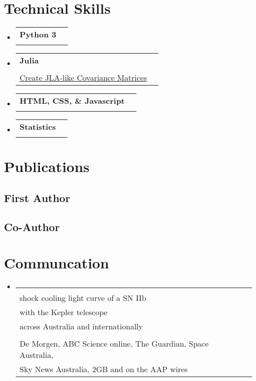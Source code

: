 \documentclass[letterpaper,11pt]{article}
\makeatletter
\newcommand{\resumeItem}[1]{
  \item\small{
    {#1 \vspace{-2pt}}
  }
}
\newcommand{\resumeSubheading}[4]{
  \vspace{-2pt}\item
    \begin{tabular*}{0.97\textwidth}[t]{l@{\extracolsep{\fill}}r}
      \textbf{#1} & #2 \\
      \textit{\small#3} & \textit{\small #4} \\
    \end{tabular*}\vspace{-7pt}
}
\newcommand{\resumeSubHeadingListStart}{\begin{itemize}[leftmargin=0.15in, label={}]}
\newcommand{\resumeSubHeadingListEnd}{\end{itemize}}
\newcommand{\resumeItemListStart}{\begin{itemize}}
\newcommand{\resumeItemListEnd}{\end{itemize}\vspace{-5pt}}
\newcommand{\communicationElement}[5]{%
    \resumeSubHeadingListStart
        \resumeSubheading
            {\makecell[l]{#1}}
            {\makecell[r]{#2}}
            {\makecell[l]{#3}}
            {\makecell[r]{#4}}
            \ifthenelse{\isempty{#5}}{}{%
                \resumeItemListStart
                    \renewcommand*{\do}[1]{\resumeItem{##1}}
                    \docsvlist{#5}%
                \resumeItemListEnd
            }%
    \resumeSubHeadingListEnd
}
\newcommand{\proficiencyElement}[5]{%
    \resumeSubHeadingListStart
        \resumeSubheading
            {#1}
            {#2}
            {\makecell[l]{#3}}
            {#4}
            {#5}
    \resumeSubHeadingListEnd
}
\makeatother
\begin{document}
\section{Technical Skills}

    \proficiencyElement{Python 3}{}{Example Projects: \href{https://github.com/dessn/Pippin}{\underline{Pippin Pipeline}}, \href{https://github.com/dessn/BiasValidation}{\underline{Approximate Neyman Construction Cosmology Validator}}}{}{}
    \proficiencyElement{Julia}{}{Example Projects: \href{https://github.com/OmegaLambda1998/ShockCooling.jl}{\underline{Fit Type II Shock Cooling Lightcurves}}, \href{https://github.com/OmegaLambda1998/SALTJacobian.jl}{\underline{Approximate SALT2/3 Simulations}},\\\phantom{\hbox{Example Projects: }}\href{https://github.com/OmegaLambda1998/JLACovarianceMatrix.jl}{\underline{Create JLA-like Covariance Matrices}}}{}{}
    \proficiencyElement{HTML, CSS, \& Javascript}{}{Example Projects: \href{https://www.mso.anu.edu.au/debass/}{\underline{DEBass Survey}}, \href{https://www.omegalambda.au/}{\underline{Personal Website}}}{}{}
    \proficiencyElement{Statistics}{}{MCMC, ABC, and other Bayesian Inference, Frequentist Inference, Data Analysis, Data Visualisation}{}{}


\section{Publications}

    \subsection{First Author}

    \subsection{Co-Author}

\newpage{}\section{Communcation}

    \communicationElement{SN2017jgh: a high-cadence complete\\shock cooling light curve of a SN IIb\\with the Kepler telescope}{Over 180 items in print, radio, and online,\\across Australia and internationally}{\textbf{Highlights:}, Al Jazeera, National Geographic Indonesia, Radio Canada,\\De Morgen, ABC Science online, The Guardian, Space Australia,\\Sky News Australia, 2GB and on the AAP wires}{2021}{}
\end{document}
